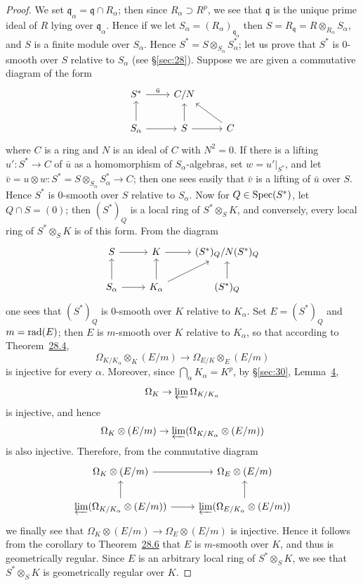 \begin{proof}
We set $\mathfrak{q}_\alpha = \mathfrak{q} \cap R_\alpha$; then since $R_\alpha \supset R^p$, we see that
$\mathfrak{q}$ is the unique prime ideal of $R$ lying over $\mathfrak{q}_\alpha$. Hence if we let
$S_\alpha = (R_\alpha)_{\mathfrak{q}_\alpha}$ then $S = R_\mathfrak{q} = R \otimes_{R_\alpha} S_\alpha$, and $S$ is a
finite module over $S_\alpha$. Hence $S^* = S \otimes_{S_\alpha} S_\alpha^*$; let us prove that $S^*$
is 0-smooth over $S$ relative to $S_\alpha$ (see \S\ref{sec:28}). Suppose we are given a
commutative diagram of the form
\[
\begin{tikzcd}
S^* \arrow[r, "\bar{u}"] & C/N \\
S_\alpha \arrow[u] \arrow[r] & S \arrow[u] \arrow[r] & C \arrow[ul]
\end{tikzcd}
\]
where $C$ is a ring and $N$ is an ideal of $C$ with $N^2 = 0$. If there is a lifting
$u'\colon S^* \to C$ of $\bar{u}$ as a homomorphism of $S_\alpha$-algebras, set
$w = u'\big|_{S^*}$, and let $\bar{v} = u \otimes w\colon S^* = S \otimes_{S_\alpha} S_\alpha^* \to C$; then
one sees easily that $\bar{v}$ is a lifting of $\bar{u}$ over $S$. Hence $S^*$ is 0-smooth over
$S$ relative to $S_\alpha$. Now for $Q \in \operatorname{Spec}(S^*)$, let $Q \cap S = (0)$; then $(S^*)_Q$ is
a local ring of $S^* \otimes_S K$, and conversely, every local ring of $S^* \otimes_S K$ is of
this form. From the diagram
\[
\begin{tikzcd}
S \arrow[r] & K \arrow[r] & (S^*)_Q/N(S^*)_Q \\
S_\alpha \arrow[u] \arrow[r] & K_\alpha \arrow[u] \arrow[ru, ""'] & (S^*)_Q \arrow[u]
\end{tikzcd}
\]
one sees that $(S^*)_Q$ is 0-smooth over $K$ relative to $K_\alpha$. Set $E = (S^*)_Q$ and
$m = \operatorname{rad}(E)$; then $E$ is $m$-smooth over $K$ relative to $K_\alpha$, so that according
to Theorem~\hyperref[thm:28.4]{28.4},
\[
  \Omega_{K/K_\alpha} \otimes_K (E/m) \to \Omega_{E/K} \otimes_E (E/m)
\]
is injective for every $\alpha$. Moreover, since $\bigcap_\alpha K_\alpha = K^p$, by
\S\ref{sec:30}, Lemma~\hyperref[lem:30.4]{4},
\[
  \Omega_K \to \varprojlim \Omega_{K/K_\alpha}
\]
is injective, and hence
\[
  \Omega_K \otimes (E/m) \to \varprojlim (\Omega_{K/K_\alpha} \otimes (E/m))
\]
is also injective. Therefore, from the commutative diagram
\[
\begin{tikzcd}
\Omega_K \otimes (E/m) \arrow[r] & \Omega_E \otimes (E/m) \\
\varprojlim (\Omega_{K/K_\alpha} \otimes (E/m)) \arrow[u] \arrow[r] &
\varprojlim (\Omega_{E/K_\alpha} \otimes (E/m)) \arrow[u]
\end{tikzcd}
\]
we finally see that $\Omega_K \otimes (E/m) \to \Omega_E \otimes (E/m)$ is injective. Hence it
follows from the corollary to Theorem~\hyperref[thm:28.6]{28.6} that $E$ is $m$-smooth over $K$, and
thus is geometrically regular. Since $E$ is an arbitrary local ring of $S^* \otimes_S K$,
we see that $S^* \otimes_S K$ is geometrically regular over $K$.
\end{proof}

